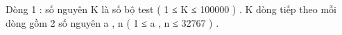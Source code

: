 Dòng 1 : số nguyên K là số bộ test ( 1 ≤ K ≤ 100000 ) . K dòng tiếp theo mỗi dòng gồm 2 số nguyên a , n (  1 ≤ a , n ≤ 32767 ) .  

\